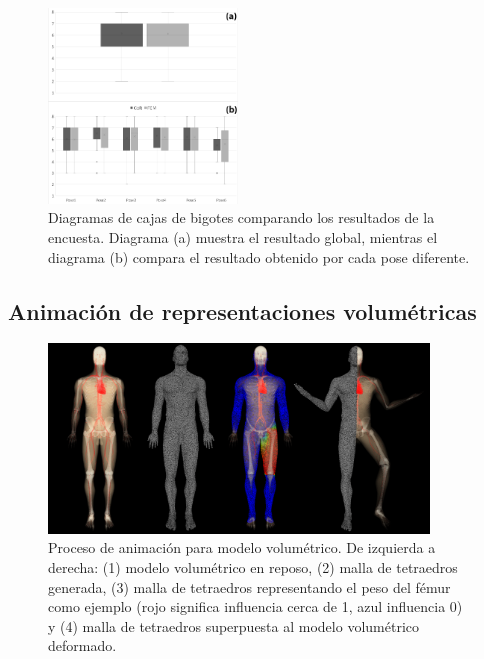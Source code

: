 %

\begin{figure}[h]%
   \centering
   \includegraphics[width=0.45\textwidth]{IMG/boxplot}
    \caption{ Diagramas de cajas de bigotes comparando los resultados de la encuesta. Diagrama (a) muestra el resultado global, mientras el diagrama (b) compara el resultado obtenido por cada pose diferente.}
\label{fig:stat}
   \end{figure}


\subsection{Animación de representaciones volumétricas}
\label{posing:animvol}

\begin{figure}[!ht]%
   \centering
   \includegraphics[width=0.90\textwidth]{IMG/Volumetric}
    \caption{Proceso de animación para modelo volumétrico. De izquierda a derecha: (1) modelo volumétrico en reposo, (2) malla de tetraedros generada, (3) malla de tetraedros representando el peso del fémur como ejemplo (rojo significa influencia cerca de 1, azul influencia 0) y (4) malla de tetraedros superpuesta al modelo volumétrico deformado. }
    \label{fig:volEx}
\end{figure}

